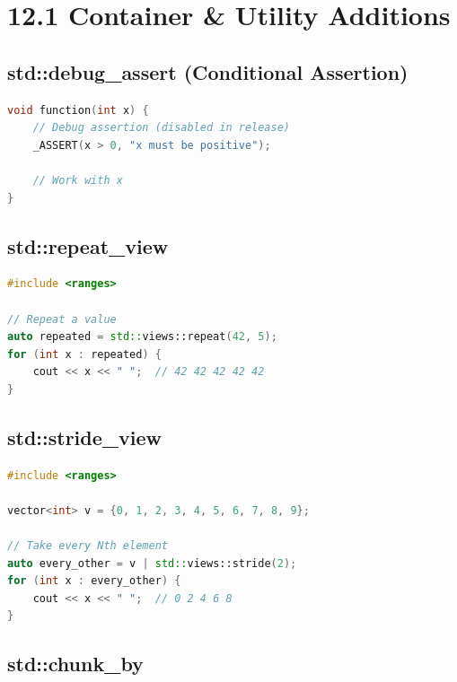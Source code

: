 \hypertarget{container-utility-additions}{%
\section{12.1 Container \& Utility
Additions}\label{container-utility-additions}}

\hypertarget{stddebug_assert-conditional-assertion}{%
\subsection{std::debug\_assert (Conditional
Assertion)}\label{stddebug_assert-conditional-assertion}}

\begin{lstlisting}[language={C++}]
void function(int x) {
    // Debug assertion (disabled in release)
    _ASSERT(x > 0, "x must be positive");
    
    // Work with x
}
\end{lstlisting}

\hypertarget{stdrepeat_view}{%
\subsection{std::repeat\_view}\label{stdrepeat_view}}

\begin{lstlisting}[language={C++}]
#include <ranges>

// Repeat a value
auto repeated = std::views::repeat(42, 5);
for (int x : repeated) {
    cout << x << " ";  // 42 42 42 42 42
}
\end{lstlisting}

\hypertarget{stdstride_view}{%
\subsection{std::stride\_view}\label{stdstride_view}}

\begin{lstlisting}[language={C++}]
#include <ranges>

vector<int> v = {0, 1, 2, 3, 4, 5, 6, 7, 8, 9};

// Take every Nth element
auto every_other = v | std::views::stride(2);
for (int x : every_other) {
    cout << x << " ";  // 0 2 4 6 8
}
\end{lstlisting}

\hypertarget{stdchunk_by}{%
\subsection{std::chunk\_by}\label{stdchunk_by}}

